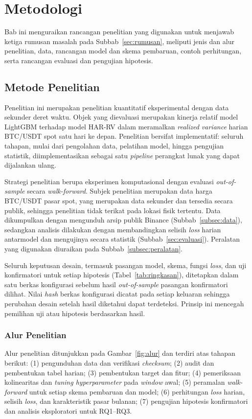 \chapter{Metodologi}

Bab ini menguraikan rancangan penelitian yang digunakan untuk menjawab ketiga
rumusan masalah pada Subbab~\ref{sec:rumusan}, meliputi jenis dan alur penelitian, data,
rancangan model dan skema pembaruan, contoh perhitungan, serta rancangan
evaluasi dan pengujian hipotesis.

\section{Metode Penelitian}
Penelitian ini merupakan penelitian kuantitatif eksperimental dengan data
sekunder deret waktu. Objek yang dievaluasi merupakan kinerja relatif model
LightGBM terhadap model HAR-RV dalam meramalkan \textit{realized variance}
harian BTC/USDT spot satu hari ke depan. Penelitian bersifat implementatif:
seluruh tahapan, mulai dari pengolahan data, pelatihan model, hingga pengujian
statistik, diimplementasikan sebagai satu \textit{pipeline} perangkat lunak
yang dapat dijalankan ulang.

Strategi penelitian berupa eksperimen komputasional dengan evaluasi
\textit{out-of-sample} secara \textit{walk-forward}. Subjek penelitian merupakan
data harga BTC/USDT pasar spot, yang merupakan data sekunder dan tersedia
secara publik, sehingga penelitian tidak terikat pada lokasi fisik tertentu.
Data dikumpulkan dengan mengunduh arsip publik Binance
(Subbab~\ref{subsec:data}), sedangkan analisis dilakukan dengan membandingkan
selisih \textit{loss} harian antarmodel dan mengujinya secara statistik
(Subbab~\ref{sec:evaluasi}). Peralatan yang digunakan diuraikan pada
Subbab~\ref{subsec:peralatan}.

Seluruh keputusan desain, termasuk pasangan model, skema, fungsi \textit{loss},
dan uji konfirmatori untuk setiap hipotesis (Tabel~\ref{tab:ringkasan}),
ditetapkan dalam satu berkas konfigurasi sebelum hasil \textit{out-of-sample}
pasangan konfirmatori dilihat. Nilai \textit{hash} berkas konfigurasi dicatat
pada setiap keluaran sehingga perubahan desain setelah hasil diketahui dapat
terdeteksi. Prinsip ini mencegah pemilihan uji atau hipotesis berdasarkan
hasil.

\subsection{Alur Penelitian}
Alur penelitian ditunjukkan pada Gambar~\ref{fig:alur} dan terdiri atas
tahapan berikut: (1) pengunduhan data dan verifikasi \textit{checksum};
(2) audit dan pembentukan tabel harian; (3) pembentukan target dan fitur;
(4) pemeriksaan kolinearitas dan \textit{tuning hyperparameter} pada
\textit{window} awal; (5) peramalan \textit{walk-forward} untuk setiap skema
pembaruan dan model; (6) perhitungan \textit{loss} harian, selisih
\textit{loss}, dan karakteristik pasar bulanan; (7) pengujian hipotesis
konfirmatori dan analisis eksploratori untuk RQ1--RQ3.

